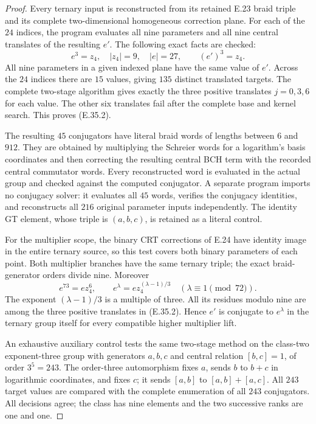 \begin{proof}
Every ternary input is reconstructed from its retained
E.23 braid triple and its complete two-dimensional
homogeneous correction plane. For each of the $24$
indices, the program evaluates all nine parameters
and all nine central translates of the resulting
$e'$. The following exact facts are checked:
\[
 e^3=z_4,\quad |z_4|=9,\quad |e|=27,
 \qquad (e')^3=z_4.
 \tag{E.35.9}
\]
All nine parameters in a given indexed plane have
the same value of $e'$. Across the $24$ indices
there are $15$ values, giving $135$ distinct translated
targets. The complete two-stage algorithm gives
exactly the three positive translates $j=0,3,6$
for each value. The other six translates fail after
the complete base and kernel search. This proves
(E.35.2).

The resulting $45$ conjugators have literal braid
words of lengths between $6$ and $912$. They are
obtained by multiplying the Schreier words for a
logarithm's basis coordinates and then correcting
the resulting central BCH term with the recorded
central commutator words. Every reconstructed word
is evaluated in the actual group and checked against
the computed conjugator. A separate program imports
no conjugacy solver: it evaluates all $45$ words,
verifies the conjugacy identities, and reconstructs
all $216$ original parameter inputs independently.
The identity GT element, whose triple is $(a,b,c)$,
is retained as a literal control.

For the multiplier scope, the binary CRT corrections
of E.24 have identity image in the entire ternary
source, so this test covers both binary parameters
of each point. Both multiplier branches have the
same ternary triple; the exact braid-generator orders
divide nine. Moreover
\[
 e^{73}=e z_4^6,
 \qquad
 e^\lambda=e z_4^{(\lambda-1)/3}
          \quad(\lambda\equiv1\pmod{72}).
 \tag{E.35.10}
\]
The exponent $(\lambda-1)/3$ is a multiple of three.
All its residues modulo nine are among the three
positive translates in (E.35.2). Hence $e'$ is
conjugate to $e^\lambda$ in the ternary group itself
for every compatible higher multiplier lift.

An exhaustive auxiliary control tests the same
two-stage method on the class-two exponent-three
group with generators $a,b,c$ and central relation
$[b,c]=1$, of order $3^5=243$. The order-three
automorphism fixes $a$, sends $b$ to $b+c$ in
logarithmic coordinates, and fixes $c$; it sends
$[a,b]$ to $[a,b]+[a,c]$. All $243$ target values
are compared with the complete enumeration of all
$243$ conjugators. All decisions agree; the class
has nine elements and the two successive ranks are
one and one.


\end{proof}
